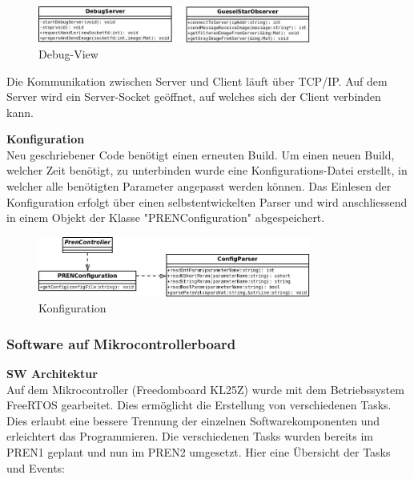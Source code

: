 \begin{figure}[H]
\centering
\includegraphics[width=0.8\textwidth]{03_Loesungskonzept/pictures/DebugView.jpeg}
\caption{Debug-View}
\end{figure}

Die Kommunikation zwischen Server und Client läuft über TCP/IP. Auf dem Server wird ein Server-Socket geöffnet, auf welches sich der Client verbinden kann.

\textbf{Konfiguration}\\[0.2cm]
Neu geschriebener Code benötigt einen erneuten Build. Um einen neuen Build, welcher Zeit benötigt, zu unterbinden wurde eine Konfigurations-Datei erstellt, in welcher alle benötigten Parameter angepasst werden können. Das Einlesen der Konfiguration erfolgt über einen selbstentwickelten Parser und wird anschliessend in einem Objekt der Klasse "PRENConfiguration" abgespeichert.

\begin{figure}[H]
\centering
\includegraphics[width=0.8\textwidth]{03_Loesungskonzept/pictures/Configuration.jpeg}
\caption{Konfiguration}
\end{figure}
 
\subsubsection{Software auf Mikrocontrollerboard}

\textbf{SW Architektur}\\[0.2cm]
Auf dem Mikrocontroller (Freedomboard KL25Z) wurde mit dem Betriebssystem FreeRTOS gearbeitet. Dies ermöglicht die Erstellung von verschiedenen Tasks. Dies erlaubt eine bessere Trennung der einzelnen Softwarekomponenten und erleichtert das Programmieren. Die verschiedenen Tasks wurden bereits im PREN1 geplant und nun im PREN2 umgesetzt. 
Hier eine Übersicht der Tasks und Events:

